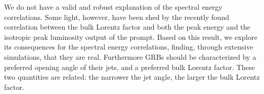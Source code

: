 


\bigskip



\bigskip

\noindent We do not have a valid and robust explanation of the spectral energy correlations. Some light, however, have been shed by the recently found correlation between the bulk Lorentz factor and both the peak energy and the isotropic peak luminosity output of the prompt. Based on this result, we explore its consequences for the spectral energy correlations, finding, through extensive simulations, that they are real. Furthermore GRBs should be characterized by a preferred opening angle of their jets, and a preferred bulk Lorentz factor. These two quantities are related: the narrower the jet angle, the larger the bulk Lorentz factor.
